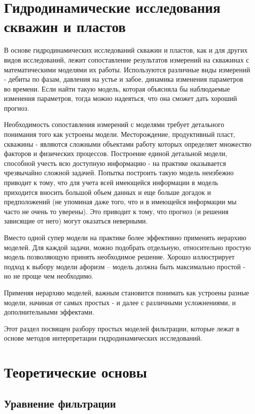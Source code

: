 
\section{Гидродинамические исследования скважин и пластов}


В основе гидродинамических исследований скважин и пластов, как и для других видов исследований, лежит сопоставление результатов измерений на скважинах с математическими моделями их работы. Используются различные виды измерений - дебиты по фазам, давления на устье и забое, динамика изменения параметров во времени. Если найти такую модель, которая объясняла бы наблюдаемые изменения параметров, тогда можно надеяться, что она сможет дать хороший прогноз.

Необходимость сопоставления измерений с моделями требует детального понимания того как устроены модели. Месторождение, продуктивный пласт, скважины - являются сложными объектами работу которых определяет множество факторов и физических процессов. Построение единой детальной модели, способной учесть всю доступную информацию - на практике оказывается чрезвычайно сложной задачей. Попытка построить такую модель неизбежно приводит к тому, что для учета всей имеющейся информации в модель приходится вносить большой объем данных и еще больше догадок и предположений (не упоминая даже того, что и в имеющейся информации мы часто не очень то уверены). Это приводит к тому, что прогноз (и решения зависящие от него) могут оказаться неверными. 

Вместо одной супер модели на практике более эффективно применять иерархию моделей. Для каждой задачи, можно подобрать отдельную, относительно простую модель позволяющую принять необходимое решение. Хорошо иллюстрирует подход к выбору модели афоризм -- модель должна быть максимально простой - но не проще чем необходимо. 

Применяя иерархию моделей, важным становится понимать как устроены разные модели, начиная от самых простых - и далее с различными усложнениями, и дополнительными эффектами.

Этот раздел посвящен разбору простых моделей фильтрации, которые лежат в основе методов интерпретации гидродинамических исследований.

\section{Теоретические основы}

\subsection{Уравнение фильтрации}

